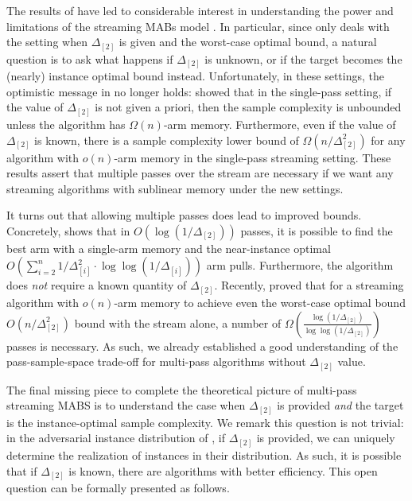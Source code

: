 The results of \cite{AssadiW20} have led to considerable interest in understanding the power and limitations of the streaming MABs model \cite{MaitiPK21,JinH0X21,AWneurips22,AgarwalKP22,Wang23Regret,LZWL23,HYZ25SODA}. In particular, since \cite{AssadiW20} only deals with the setting when $\Delta_{[2]}$ is given and the worst-case optimal bound, a natural question is to ask what happens if $\Delta_{[2]}$ is unknown, or if the target becomes the (nearly) instance optimal bound instead. Unfortunately, in these settings, the optimistic message in \cite{AssadiW20} no longer holds: \cite{AWneurips22} showed that in the single-pass setting, if the value of $\Delta_{[2]}$ is not given a priori, then the sample complexity is unbounded unless the algorithm has $\Omega(n)$-arm memory. Furthermore, even if the value of $\Delta_{[2]}$ is known, there is a sample complexity lower bound of $\Omega(n/\Delta^2_{[2]})$ for any algorithm with $o(n)$-arm memory in the single-pass streaming setting. These results assert that multiple passes over the stream are necessary if we want any streaming algorithms with sublinear memory under the new settings.

It turns out that allowing multiple passes does lead to improved bounds. Concretely, \cite{JinH0X21} shows that in $O(\log(1/\Delta_{[2]}))$ passes, it is possible to find the best arm with a single-arm memory and the near-instance optimal $O(\sum_{i=2}^{n}1/\Delta^2_{[i]}\cdot \log\log(1/\Delta_{[i]}))$ arm pulls. Furthermore, the algorithm does \emph{not} require a known quantity of $\Delta_{[2]}$. Recently, \cite{AW23BestArm} proved that for a streaming algorithm with $o(n)$-arm memory to achieve even the worst-case optimal bound $O(n/\Delta^2_{[2]})$ bound with the stream alone, a number of $\Omega\left(\frac{\log(1/\Delta_{[2]})}{\log\log(1/\Delta_{[2]})}\right)$ passes is necessary. As such, we already established a good understanding of the pass-sample-space trade-off for multi-pass algorithms without $\Delta_{[2]}$ value.

The final missing piece to complete the theoretical picture of multi-pass streaming MABS is to understand the case when $\Delta_{[2]}$ is provided \emph{and} the target is the instance-optimal sample complexity.
We remark this question is not trivial: in the adversarial instance distribution of \cite{AW23BestArm}, if $\Delta_{[2]}$ is provided, we can uniquely determine the realization of instances in their distribution. As such, it is possible that if $\Delta_{[2]}$ is known, there are algorithms with better efficiency. %
This open question can be formally presented as follows.

